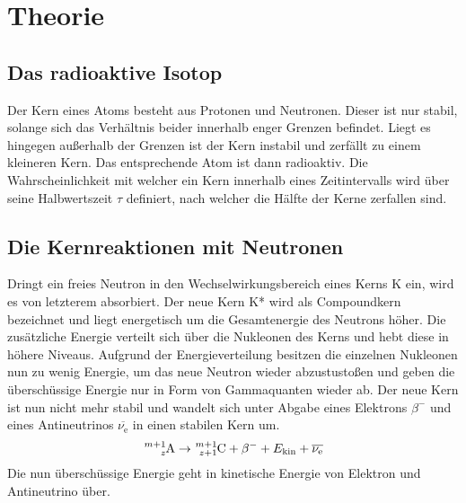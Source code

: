 
\section{Theorie}
\label{sec:Theorie}
\subsection{Das radioaktive Isotop}
Der Kern eines Atoms besteht aus Protonen und Neutronen. Dieser ist nur stabil, solange sich das Verhältnis beider innerhalb enger Grenzen befindet. Liegt es hingegen außerhalb der Grenzen ist der Kern instabil und zerfällt zu einem kleineren Kern. Das entsprechende Atom ist dann radioaktiv. Die Wahrscheinlichkeit mit welcher ein Kern innerhalb eines Zeitintervalls wird über seine Halbwertszeit $\tau$ definiert, nach welcher die Hälfte der Kerne zerfallen sind.

\subsection{Die Kernreaktionen mit Neutronen}
Dringt ein freies Neutron in den Wechselwirkungsbereich eines Kerns K ein, wird es von letzterem absorbiert. Der neue Kern K* wird als Compoundkern bezeichnet und liegt energetisch um die Gesamtenergie des Neutrons höher. Die zusätzliche Energie verteilt sich über die Nukleonen des Kerns und hebt diese in höhere Niveaus. Aufgrund der Energieverteilung besitzen die einzelnen Nukleonen nun zu wenig Energie, um das neue Neutron wieder abzustustoßen und geben die überschüssige Energie nur in Form von Gammaquanten wieder ab. Der neue Kern ist nun nicht mehr stabil und wandelt sich unter Abgabe eines Elektrons $\beta^-$ und eines Antineutrinos $\overline{\nu_\text{e}}$ in einen stabilen Kern um.
\begin{equation}
  \ce{^{m+1}_{z}A} \rightarrow \ce{^{m+1}_{z+1}C} + \beta^-  + E_\text{kin} + \overline{\nu_\text{e}}
\end{equation}
 Die nun überschüssige Energie geht in kinetische Energie von Elektron und Antineutrino über.


